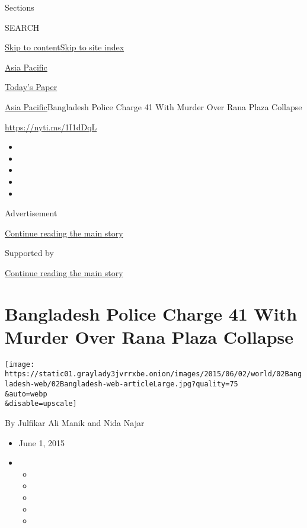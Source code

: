 Sections

SEARCH

\protect\hyperlink{site-content}{Skip to
content}\protect\hyperlink{site-index}{Skip to site index}

\href{https://www.nytimes3xbfgragh.onion/section/world/asia}{Asia
Pacific}

\href{https://myaccount.nytimes3xbfgragh.onion/auth/login?response_type=cookie\&client_id=vi}{}

\href{https://www.nytimes3xbfgragh.onion/section/todayspaper}{Today's
Paper}

\href{/section/world/asia}{Asia Pacific}\textbar{}Bangladesh Police
Charge 41 With Murder Over Rana Plaza Collapse

\url{https://nyti.ms/1I1dDqL}

\begin{itemize}
\item
\item
\item
\item
\item
\end{itemize}

Advertisement

\protect\hyperlink{after-top}{Continue reading the main story}

Supported by

\protect\hyperlink{after-sponsor}{Continue reading the main story}

\hypertarget{bangladesh-police-charge-41-with-murder-over-rana-plaza-collapse}{%
\section{Bangladesh Police Charge 41 With Murder Over Rana Plaza
Collapse}\label{bangladesh-police-charge-41-with-murder-over-rana-plaza-collapse}}

\texttt{[image: https://static01.graylady3jvrrxbe.onion/images/2015/06/02/world/02Bangladesh-web/02Bangladesh-web-articleLarge.jpg?quality=75\\\&auto=webp\\\&disable=upscale]}

By Julfikar Ali Manik and Nida Najar

\begin{itemize}
\item
  June 1, 2015
\item
  \begin{itemize}
  \item
  \item
  \item
  \item
  \item
  \end{itemize}
\end{itemize}

